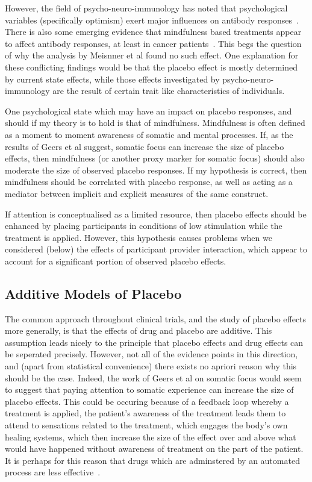 However, the field of psycho-neuro-immunology has noted that psychological variables (specifically optimism) exert major influences on antibody responses~\cite{Carver2010}. There is also some emerging evidence that mindfulness based treatments appear to affect antibody responses, at least in cancer patients~\cite{Ledesma2009}. This begs the question of why the analysis by Meisnner et al found no such effect. One explanation for these conflicting findings would be that the placebo effect is mostly determined by current state effects, while those effects investigated by psycho-neuro-immunology are the result of certain trait like characteristics of individuals.  

One psychological state which may have an impact on placebo responses, and should if my theory is to hold is that of mindfulness. Mindfulness is often defined as a moment to moment awareness of somatic and mental processes. If, as the results of Geers et al suggest, somatic focus can increase the size of placebo effects, then mindfulness (or another proxy marker for somatic focus) should also moderate the size of observed placebo responses. If my hypothesis is correct, then mindfulness should be correlated with placebo response, as well as acting as a mediator between implicit and explicit measures of the same construct. 

If attention is conceptualised as a limited resource, then placebo effects should be enhanced by placing participants in conditions of low stimulation while the treatment is applied. However, this hypothesis causes problems when we considered (below) the effects of participant provider interaction, which appear to account for a significant portion of observed placebo effects. 

\subsection{Additive Models of Placebo}

The common approach throughout clinical trials, and the study of placebo effects more generally, is that the effects of drug and placebo are additive. This assumption leads nicely to the principle that placebo effects and drug effects can be seperated precisely. However, not all of the evidence points in this direction, and (apart from statistical convenience) there exists no apriori reason why this should be the case. Indeed, the work of Geers et al on somatic focus would seem to suggest that paying attention to somatic experience can increase the size of placebo effects. This could be occuring because of a feedback loop whereby a treatment is applied, the patient's awareness of the treatment leads them to attend to sensations related to the treatment, which engages the body's own healing systems, which then increase the size of the effect over and above what would have happened without awareness of treatment on the part of the patient. It is perhaps for this reason that drugs which are adminstered by an automated process are less effective~\cite{benedetti2003}. 

